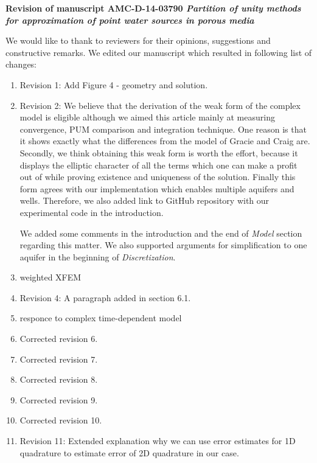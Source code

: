 \documentclass[a4paper,11pt]{article}
\begin{document}
{
\begin{center}
{\Large\bf Revision of manuscript AMC-D-14-03790 
\newline
\newline
\emph{Partition of unity methods for approximation of point water sources in porous media}}
\end{center}
}

We would like to thank to reviewers for their opinions, suggestions and constructive remarks.
We edited our manuscript which resulted in following list of changes:

\begin{enumerate}
\item Revision 1: Add Figure 4 - geometry and solution. %
\item Revision 2: %
      We believe that the derivation of the weak form of the complex model is eligible
      although we aimed this article mainly at measuring convergence, PUM comparison and integration technique.
      One reason is that it shows exactly what the differences from the model of Gracie and Craig are.
      Secondly, we think obtaining this weak form is worth the effort, because it displays the elliptic
      character of all the terms which one can make a profit out of while proving existence and uniqueness of the solution.
      Finally this form agrees with our implementation which enables multiple aquifers and wells.
      Therefore, we also added link to GitHub repository with our experimental code in the introduction.
      
      We added some comments in the introduction and the end of \emph{Model} section regarding this matter.
      We also supported arguments for simplification to one aquifer in the beginning of \emph{Discretization}.
\item weighted XFEM %
\item Revision 4: A paragraph added in section 6.1.%
\item responce to complex time-dependent model %

\item Corrected revision 6. %
\item Corrected revision 7. %
\item Corrected revision 8. %
\item Corrected revision 9. %
\item Corrected revision 10. %

\item Revision 11: Extended explanation why we can use error estimates for 1D quadrature to estimate error of 2D quadrature in our case. %


\end{enumerate}
\end{document}
